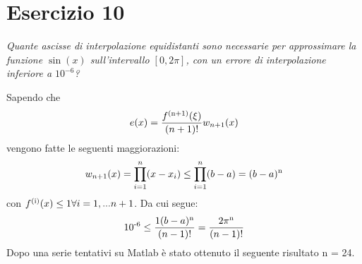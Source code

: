 \section{Esercizio 10}
\label{sub:Esercizio 10}
\emph{Quante ascisse di interpolazione equidistanti sono necessarie per approssimare la funzione $\sin(x)$ sull'intervallo $[0,2\pi]$, con un errore di interpolazione inferiore a $10^{-6}$?}
\begin{sol}
	Sapendo che
	\[e(x)={\frac{f\textsuperscript{(n+1)}(\xi)}{(n+1)!}}w_{n+1}(x)\]
	vengono fatte le seguenti maggiorazioni:
	\[w_{n+1}(x)=\prod\limits_{i=1}^n (x-x_{i}) \leq \prod\limits_{i=1}^n (b-a) = (b-a)\textsuperscript{n}\]
	con $f\textsuperscript{(i)}(x) \leq 1 \forall{i=1,...n+1}$.
	Da cui segue:
	\[10\textsuperscript{-6} \leq \frac{1\text{}(b-a)\textsuperscript{n}}{(n-1)!} = \frac{2\pi\textsuperscript{n}}{(n-1)!}\]
	Dopo una serie tentativi su Matlab è stato ottenuto il seguente risultato n = 24.

	
\end{sol}

